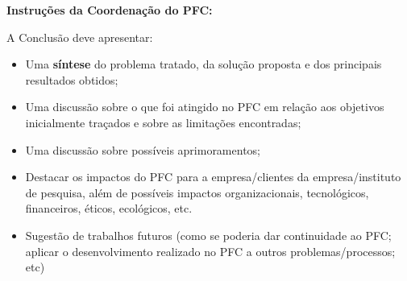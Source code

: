 

\textbf{Instruções da Coordenação do PFC:}

A Conclusão deve apresentar:
\begin{itemize}
	\item Uma \textbf{síntese} do problema tratado, da solução proposta e dos principais resultados obtidos;
	\item Uma discussão sobre o que foi atingido no PFC em relação aos objetivos inicialmente traçados e sobre as limitações encontradas;
	\item Uma discussão sobre possíveis aprimoramentos;
	\item Destacar os impactos do PFC para a empresa/clientes da empresa/instituto de pesquisa, além de possíveis impactos organizacionais, tecnológicos, financeiros, éticos, ecológicos, etc. 
	\item Sugestão de trabalhos futuros (como se poderia dar continuidade ao PFC; aplicar o desenvolvimento realizado no PFC a outros problemas/processos; etc)
\end{itemize}
